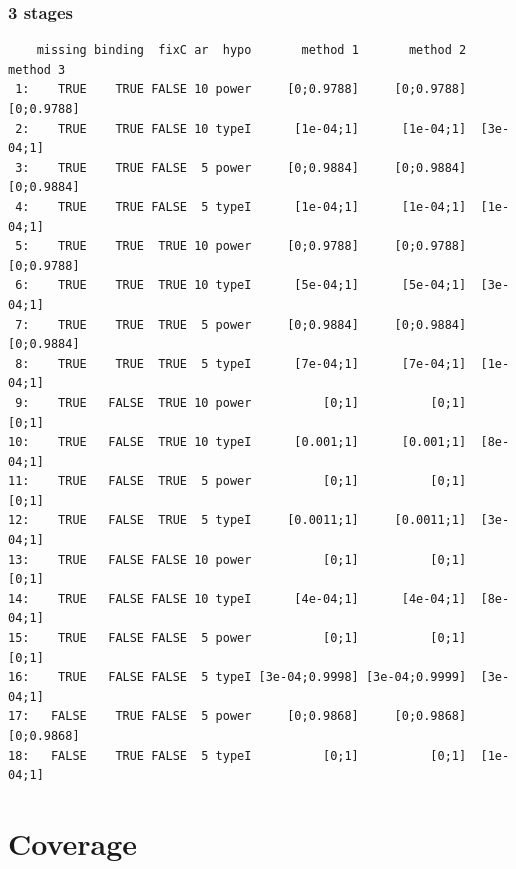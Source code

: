 \documentclass[12pt]{article}
\begin{document}
\subsubsection{3 stages}
\label{sec:org80addff}
\begin{verbatim}
    missing binding  fixC ar  hypo       method 1       method 2   method 3
 1:    TRUE    TRUE FALSE 10 power     [0;0.9788]     [0;0.9788] [0;0.9788]
 2:    TRUE    TRUE FALSE 10 typeI      [1e-04;1]      [1e-04;1]  [3e-04;1]
 3:    TRUE    TRUE FALSE  5 power     [0;0.9884]     [0;0.9884] [0;0.9884]
 4:    TRUE    TRUE FALSE  5 typeI      [1e-04;1]      [1e-04;1]  [1e-04;1]
 5:    TRUE    TRUE  TRUE 10 power     [0;0.9788]     [0;0.9788] [0;0.9788]
 6:    TRUE    TRUE  TRUE 10 typeI      [5e-04;1]      [5e-04;1]  [3e-04;1]
 7:    TRUE    TRUE  TRUE  5 power     [0;0.9884]     [0;0.9884] [0;0.9884]
 8:    TRUE    TRUE  TRUE  5 typeI      [7e-04;1]      [7e-04;1]  [1e-04;1]
 9:    TRUE   FALSE  TRUE 10 power          [0;1]          [0;1]      [0;1]
10:    TRUE   FALSE  TRUE 10 typeI      [0.001;1]      [0.001;1]  [8e-04;1]
11:    TRUE   FALSE  TRUE  5 power          [0;1]          [0;1]      [0;1]
12:    TRUE   FALSE  TRUE  5 typeI     [0.0011;1]     [0.0011;1]  [3e-04;1]
13:    TRUE   FALSE FALSE 10 power          [0;1]          [0;1]      [0;1]
14:    TRUE   FALSE FALSE 10 typeI      [4e-04;1]      [4e-04;1]  [8e-04;1]
15:    TRUE   FALSE FALSE  5 power          [0;1]          [0;1]      [0;1]
16:    TRUE   FALSE FALSE  5 typeI [3e-04;0.9998] [3e-04;0.9999]  [3e-04;1]
17:   FALSE    TRUE FALSE  5 power     [0;0.9868]     [0;0.9868] [0;0.9868]
18:   FALSE    TRUE FALSE  5 typeI          [0;1]          [0;1]  [1e-04;1]
\end{verbatim}

\clearpage 

\section{Coverage}
\label{sec:orgc3ffccc}
\end{document}
